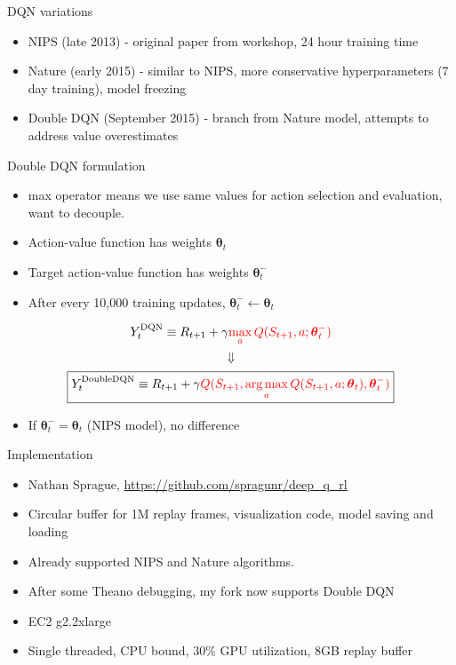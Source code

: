 \documentclass{beamer}
\DeclareMathOperator*{\argmax}{arg\,max}
\begin{document}
\begin{frame}{DQN variations}
  \begin{itemize}
  \item {
      NIPS (late 2013) - original paper from workshop, 24 hour training time
  }
  \item {
      Nature (early 2015) - similar to NIPS, more conservative hyperparameters (7 day training), model freezing
  }
  \item {
      Double DQN (September 2015) - branch from Nature model, attempts to address value overestimates
  }
  \end{itemize}
\end{frame}

\begin{frame}{Double DQN formulation}
  \begin{itemize}
    \item max operator means we use same values for action selection and evaluation, want to decouple.
    \item Action-value function has weights $\boldsymbol{\theta}_t$
    \item Target action-value function has weights $\boldsymbol{\theta}_t^-$
    \item After every 10,000 training updates, $\boldsymbol{\theta}_t^- \leftarrow \boldsymbol{\theta}_t$
  \end{itemize}

  \[Y_t^{\textrm{DQN}} \equiv R_{t+1} + \gamma \textcolor{red}{\max_{a} Q(S_{t+1},a;\boldsymbol{\theta}_t^-)} \]
  \[ \Downarrow \]
  \[\boxed{Y_t^{\textrm{DoubleDQN}} \equiv R_{t+1} + \gamma \textcolor{red}{Q(S_{t+1},\argmax_a Q(S_{t+1},a;\boldsymbol{\theta}_t),\boldsymbol{\theta}_t^-)}} \]
  \begin{itemize}
    \item If $\boldsymbol{\theta}_t^- = \boldsymbol{\theta}_t$ (NIPS model), no difference
  \end{itemize}
\end{frame}

\begin{frame}{Implementation}
  \begin{itemize}
    \item Nathan Sprague, \href{https://github.com/spragunr/deep_q_rl}{https://github.com/spragunr/deep\_q\_rl}
    \item Circular buffer for 1M replay frames, visualization code, model saving and loading
    \item Already supported NIPS and Nature algorithms.
    \item After some Theano debugging, my fork now supports Double DQN
    \item EC2 g2.2xlarge
    \item Single threaded, CPU bound, 30\% GPU utilization, 8GB replay buffer
  \end{itemize}
\end{frame}
\end{document}
